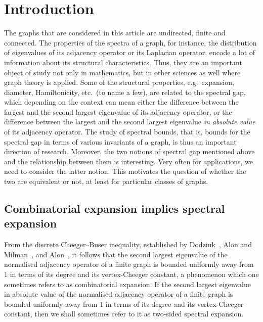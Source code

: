 \documentclass[10pt]{article}
\theoremstyle{definition}
\begin{document}
\section{Introduction}

The graphs that are considered in this article are undirected, finite and connected. The properties of the spectra of a graph, for instance, the distribution of eigenvalues of its adjacency operator or its Laplacian operator, encode a lot of information about its structural characteristics. Thus, they are an important object of study not only in mathematics, but in other sciences as well where graph theory is applied. Some of the structural properties, e.g.~expansion, diameter, Hamiltonicity, etc.~(to name a few), are related to the spectral gap, which depending on the context can mean either the difference between the largest and the second largest eigenvalue of its adjacency operator, or the difference between the largest and the second largest eigenvalue \emph{in absolute value} of its adjacency operator. The study of spectral bounds, that is, bounds for the spectral gap in terms of various invariants of a graph, is thus an important direction of research. Moreover, the two notions of spectral gap mentioned above and the relationship between them is interesting. Very often for applications, we need to consider the latter notion. This motivates the question of whether the two are equivalent or not, at least for particular classes of graphs.

\subsection{Combinatorial expansion implies spectral expansion}
From the discrete Cheeger--Buser inequality, established by Dodziuk~\cite{DodziukDifferenceEqnIsoperimetricIneq}, Alon and Milman~\cite{AlonMilmanIsoperiIneqSupConcen}, and Alon~\cite{AlonEigenvalueExpand}, it follows that the second largest eigenvalue of the normalised adjacency operator of a finite graph is bounded uniformly away from $1$ in terms of its degree and its vertex-Cheeger constant, a phenomenon which one sometimes refers to as combinatorial expansion. If the second largest eigenvalue in absolute value of the normalised adjacency operator of a finite graph is bounded uniformly away from $1$ in terms of its degree and its vertex-Cheeger constant, then we shall sometimes refer to it as two-sided spectral expansion.
\end{document}
